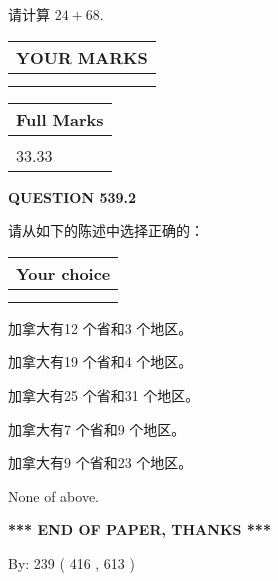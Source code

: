 \documentclass{ctexart}
\begin{document}
  
 
请计算 $ %
24 +  %
68 $.
 

 

 
  
\vspace{0.2in}
  
\noindent\begin{tabular}{|l|}
\hline
 YOUR MARKS  \\
\hline
 \\ 
 \\ 
\hline
\end{tabular}
\hspace{0.05in} \begin{tabular}{|l|}
\hline
 Full Marks  \\
\hline
 \\ 
33.33 \\
\hline
\end{tabular}
{\textbf{\Large{QUESTION
539.2 
}}}
  
  
请从如下的陈述中选择正确的：
  
  
\noindent\hspace{3.0in} \begin{tabular}{|l|}
\hline
Your choice \\
\hline
 \\ 
 \\ 
\hline
\end{tabular}
  
  
 
 
加拿大有12 个省和3 个地区。
 
 
加拿大有19 个省和4 个地区。
 
 
加拿大有25 个省和31 个地区。
 
 
加拿大有7 个省和9 个地区。
 
 
加拿大有9 个省和23 个地区。
 
 
 None of above.
 
 
   
   
 \vspace{0.2in}
 
   
   
   
   
\vspace{1.0in} 
{\textbf{\large{ *** END OF PAPER, THANKS *** }}} 
   
   
\hspace{1.0in} By: 
 239 ( 416 ,  613 )
   
\end{document}

